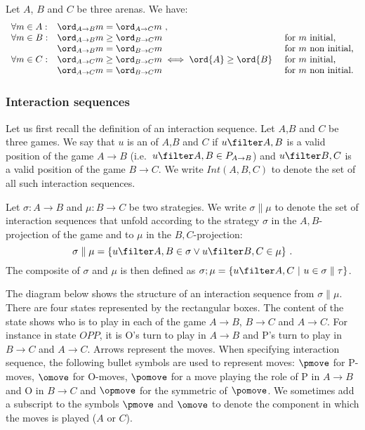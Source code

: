\begin{lemma}
\label{lem:compositionorder}
Let $A$, $B$ and $C$ be three arenas. We have:
$$\begin{array}{lll}
\forall m \in A:
    &  \ord_{A\rightarrow B}{m} = \ord_{A\rightarrow C}{m} \ ,\\
\forall m \in B:
    & \ord_{A\rightarrow B}{m} \geq \ord_{B\rightarrow C}{m}  & \mbox{for $m$ initial,}\\
    & \ord_{A\rightarrow B}{m} = \ord_{B\rightarrow C}{m} & \mbox{for $m$ non initial,} \\
\forall m \in C:
    & \ord_{A\rightarrow C}{m} \geq \ord_{B\rightarrow C}{m} \iff
\ord{A} \geq \ord{B}\ & \mbox{for $m$ initial,}\\
    & \ord_{A\rightarrow C}{m} = \ord_{B\rightarrow C}{m}   & \mbox{for $m$ non initial.}
\end{array}
$$
\end{lemma}





\subsubsection{Interaction sequences}
Let us first recall the definition of an interaction sequence.
Let $A$,$B$ and $C$ be three games. 
We say that $u$  is an  of $A$,$B$ and $C$ if $u\filter A,B$ is a valid position of the game $A\rightarrow B$
(i.e.~$u\filter A,B \in P_{A\rightarrow B}$) 
and  $u\filter B,C$ is a valid position of the game
$B\rightarrow  C$. We write $Int(A,B,C)$ to denote
the set of all such interaction sequences.

Let $\sigma:A\rightarrow B$ and $\mu:B\rightarrow C$
be two strategies. We write $\sigma \parallel \mu$ to denote the 
set of interaction sequences that unfold according to the strategy $\sigma$ in the $A,B$-projection of the game and 
to $\mu$ in the $B,C$-projection:
$$ \sigma \parallel \mu = \{ u\filter A,B \in \sigma \vee u \filter B,C \in \mu \} \ .$$
The composite of $\sigma$ and $\mu$ is then defined as $\sigma ; \mu = \{ u \filter A,C \ | \ u \in \sigma \parallel \tau \}$.

The diagram below shows the structure of an interaction sequence
from $\sigma \parallel \mu$. There are four states represented by the rectangular boxes. The content of the state shows who is to play in each of the game $A\rightarrow B$, $B\rightarrow C$ and $A\rightarrow C$.
For instance in state $OPP$, it is O's turn to play in 
$A\rightarrow B$ and P's turn to play in $B\rightarrow C$ and $A\rightarrow C$. Arrows represent the moves.
When specifying interaction sequence,
the following bullet symbols are used to represent moves:
$\pmove$ for P-moves, $\omove$ for O-moves, $\pomove$ 
for a move playing the role of P in $A\rightarrow B$
and O in $B\rightarrow C$ and $\opmove$ for
the symmetric of $\pomove$.
We sometimes add a subscript to the symbols $\pmove$ and $\omove$ to denote the component in which the moves is played ($A$ or $C$).


